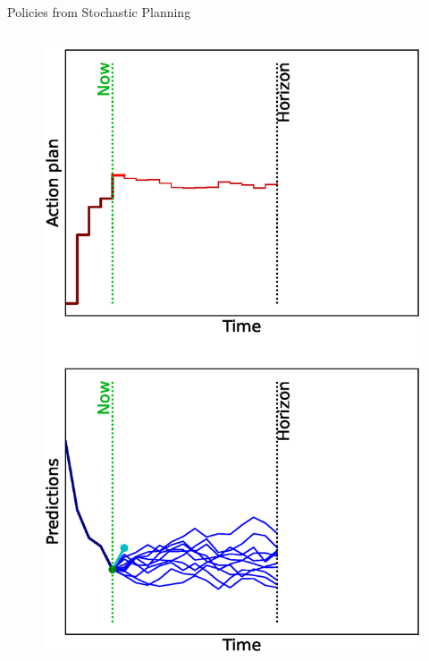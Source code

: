 \documentclass[lecture]{beamer}
\begin{document}
\begin{frame}{\normalsize Policies from Stochastic Planning}
\begin{columns}
\begin{overlayarea}{\textwidth}{0.9\textheight}
\begin{figure}
{          \includegraphics[width=\FS\textwidth,clip]{Codes/MPC/MPCMC4.eps}
        }%
        {%
}
\end{figure}
\end{overlayarea}
\end{columns}
\end{frame}
\end{document}

